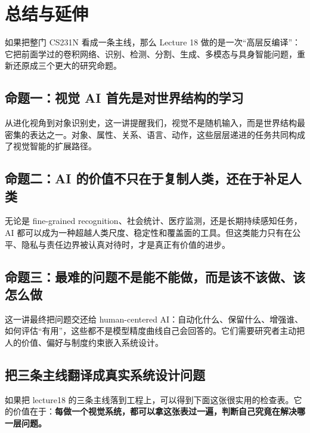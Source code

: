 \section{总结与延伸}

如果把整门 CS231N 看成一条主线，那么 Lecture 18 做的是一次``高层反编译''：它把前面学过的卷积网络、识别、检测、分割、生成、多模态与具身智能问题，重新还原成三个更大的研究命题。

\subsection{命题一：视觉 AI 首先是对世界结构的学习}

从进化视角到对象识别史，这一讲提醒我们，视觉不是随机输入，而是世界结构最密集的表达之一。对象、属性、关系、语言、动作，这些层层递进的任务共同构成了视觉智能的扩展路径。

\subsection{命题二：AI 的价值不只在于复制人类，还在于补足人类}

无论是 fine-grained recognition、社会统计、医疗监测，还是长期持续感知任务，AI 都可以成为一种超越人类尺度、稳定性和覆盖面的工具。但这类能力只有在公平、隐私与责任边界被认真对待时，才是真正有价值的进步。

\subsection{命题三：最难的问题不是能不能做，而是该不该做、该怎么做}

这一讲最终把问题交还给 human-centered AI：自动化什么、保留什么、增强谁、如何评估``有用''，这些都不是模型精度曲线自己会回答的。它们需要研究者主动把人的价值、偏好与制度约束嵌入系统设计。

\subsection{把三条主线翻译成真实系统设计问题}

如果把 lecture18 的三条主线落到工程上，可以得到下面这张很实用的检查表。它的价值在于：\textbf{每做一个视觉系统，都可以拿这张表过一遍，判断自己究竟在解决哪一层问题。}

